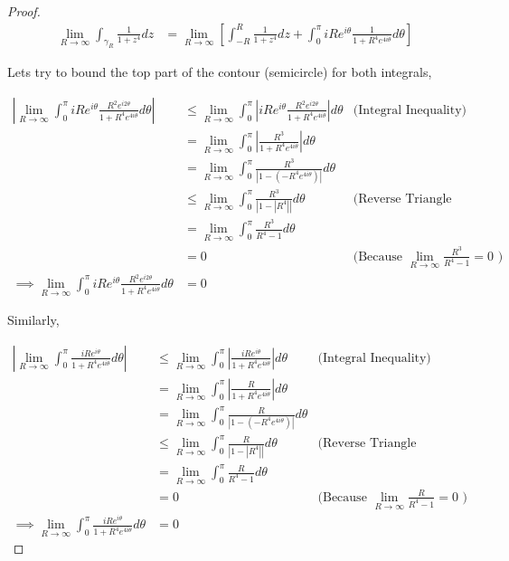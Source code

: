 \documentclass{article}
\newcommand{\abs}[1]{\left\lvert #1\right\rvert}
\begin{document}
\begin{proof}
    \begin{align*}
        \lim_{R \to \infty} \int_{\gamma_R} \frac{1}{1 + z^4} dz &= \lim_{R \to \infty} \left[\int_{-R}^{R}  \frac{1}{1 + z^4} dz + \int_{0}^{\pi} iRe^{i \theta} \frac{1}{1 + R^{4}e^{4 i \theta}} d \theta \right] 
    \end{align*}

    Lets try to bound the top part of the contour (semicircle) for both integrals, 

    \begin{align*}
        \abs{\lim_{R \to \infty} \int_{0}^{\pi} iRe^{i \theta} \frac{R^2e^{i 2\theta}}{1 + R^{4}e^{4 i \theta}} d \theta} &\leq  \lim_{R \to \infty} \int_{0}^{\pi} \abs{ iRe^{i \theta} \frac{R^2e^{i 2\theta}}{1 + R^{4}e^{4 i \theta}}} d \theta & \text{(Integral Inequality)} \\
        &= \lim_{R \to \infty} \int_{0}^{\pi} \abs{\frac{R^3}{1 + R^{4}e^{4 i \theta}}} d \theta \\
        &= \lim_{R \to \infty} \int_{0}^{\pi} \frac{R^3}{\abs{1 - \left(-R^{4}e^{4 i \theta}\right)}} d \theta \\
        &\leq \lim_{R \to \infty} \int_{0}^{\pi} \frac{R^3}{\abs{1 - \abs{R^4}}} d \theta & \text {(Reverse Triangle Inequality)} \\
        &= \lim_{R \to \infty} \int_{0}^{\pi} \frac{R^3}{R^4 - 1} d \theta \\
        &= 0 & \text{(Because $\lim_{R \to \infty} \frac{R^3}{R^4 - 1} = 0$ )}\\
        \implies \lim_{R \to \infty} \int_{0}^{\pi} iRe^{i \theta} \frac{R^2e^{i 2\theta}}{1 + R^{4}e^{4 i \theta}} d \theta &= 0
    \end{align*}

    Similarly, 

    \begin{align*}
        \abs{\lim_{R \to \infty} \int_{0}^{\pi}  \frac{iRe^{i \theta}}{1 + R^{4}e^{4 i \theta}} d \theta} &\leq  \lim_{R \to \infty} \int_{0}^{\pi} \abs{ \frac{iRe^{i \theta}}{1 + R^{4}e^{4 i \theta}}} d \theta & \text{(Integral Inequality)} \\
        &= \lim_{R \to \infty} \int_{0}^{\pi} \abs{\frac{R}{1 + R^{4}e^{4 i \theta}}} d \theta \\
        &= \lim_{R \to \infty} \int_{0}^{\pi} \frac{R}{\abs{1 - \left(-R^{4}e^{4 i \theta}\right)}} d \theta \\
        &\leq \lim_{R \to \infty} \int_{0}^{\pi} \frac{R}{\abs{1 - \abs{R^4}}} d \theta & \text {(Reverse Triangle Inequality)} \\
        &= \lim_{R \to \infty} \int_{0}^{\pi} \frac{R}{R^4 - 1} d \theta \\
        &= 0 & \text{(Because $\lim_{R \to \infty} \frac{R}{R^4 - 1} = 0$ )} \\
        \implies \lim_{R \to \infty} \int_{0}^{\pi}  \frac{iRe^{i \theta}}{1 + R^{4}e^{4 i \theta}} d \theta &= 0
    \end{align*}


\end{proof}
\end{document}
